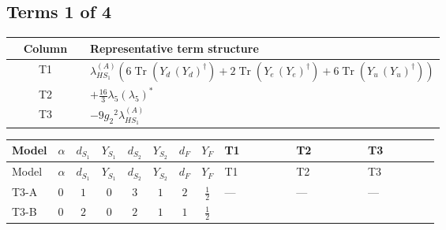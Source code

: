 \documentclass[8pt]{article}
\begin{document}
\begin{landscape}
\subsection*{Terms 1 of 4}
\begin{center}
\begin{tabular}{@{}c >{\raggedright\arraybackslash}p{0.82\linewidth}@{}}
\toprule
Column & Representative term structure \\
\midrule
T1 & \(\displaystyle {\lambda_{HS_1}^{(A)}} (6 \operatorname{Tr}\!\left({Y_d}\,\left({Y_d}\right)^{\dagger}\right)+2 \operatorname{Tr}\!\left({Y_e}\,\left({Y_e}\right)^{\dagger}\right)+6 \operatorname{Tr}\!\left({Y_u}\,\left({Y_u}\right)^{\dagger}\right))\) \\
\midrule
T2 & \(\displaystyle +\frac{16}{3} {\lambda_5} \left({\lambda_5}\right)^{*}\) \\
\midrule
T3 & \(\displaystyle -9 {g_2}^2 {\lambda_{HS_1}^{(A)}}\) \\
\midrule
\bottomrule
\end{tabular}
\end{center}
\smallskip
\tiny
\begin{longtable}{@{}llcccccc >{\raggedright\arraybackslash}p{0.21\linewidth} >{\raggedright\arraybackslash}p{0.21\linewidth} >{\raggedright\arraybackslash}p{0.21\linewidth}@{}}
\toprule
Model & $\alpha$ & $d_{S_1}$ & $Y_{S_1}$ & $d_{S_2}$ & $Y_{S_2}$ & $d_F$ & $Y_F$ & T1 & T2 & T3 \\
\midrule
\endfirsthead
\toprule
Model & $\alpha$ & $d_{S_1}$ & $Y_{S_1}$ & $d_{S_2}$ & $Y_{S_2}$ & $d_F$ & $Y_F$ & T1 & T2 & T3 \\
\midrule
\endhead
T3-A & $0$ & $1$ & $0$ & $3$ & $1$ & $2$ & $\frac{1}{2}$ & --- & --- & --- \\
\midrule
T3-B & $0$ & $2$ & $0$ & $2$ & $1$ & $1$ & $\frac{1}{2}$ & \scriptsize\adjustbox{max width=\linewidth}{$\begin{gathered} {\lambda_{HS_1}^{(A)}} (6 \operatorname{Tr}\!\left({Y_d}\,\left({Y_d}\right)^{\dagger}\right)+2 \operatorname{Tr}\!\left({Y_e}\,\left({Y_e}\right)^{\dagger}\right)+6 \operatorname{Tr}\!\left({Y_u}\,\left({Y_u}\right)^{\dagger}\right))\end{gathered}$} & \scriptsize\adjustbox{max width=\linewidth}{$\begin{gathered} +\frac{16}{3} {\lambda_5} \left({\lambda_5}\right)^{*}\end{gathered}$} & \scriptsize\adjustbox{max width=\linewidth}{$\begin{gathered} -9 {g_2}^2 {\lambda_{HS_1}^{(A)}}\end{gathered}$} \\

\end{longtable}
\end{landscape}
\end{document}
